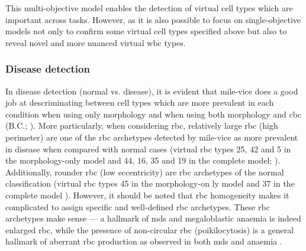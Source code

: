 \begin{figure}[!ht]
    \label{fig:rbc-mo-examples}
\end{figure}

This multi-objective model enables the detection of virtual cell types which are important across tasks. However, as it is also possible to focus on single-objective models not only to confirm some virtual cell types specified above but also to reveal novel and more nuanced virtual \ac{wbc} types.

\subsubsection{Disease detection} 

In disease detection (normal vs. disease), it is evident that \ac{mile-vice} does a good job at descriminating between cell types which are more prevalent in each condition when using only morphology and when using both morphology and \ac{cbc} (B.C.; ). More particularly, when considering \ac{rbc}, relatively large \ac{rbc} (high perimeter) are one of the \ac{rbc} archetypes detected by \ac{mile-vice} as more prevalent in disease when compared with normal cases (virtual \ac{rbc} types 25, 42 and 5 in the morphology-only model and 44, 16, 35 and 19 in the complete model; ). Additionally, rounder \ac{rbc} (low eccentricity) are \ac{rbc} archetypes of the normal classification (virtual \ac{rbc} types 45 in the morphology-on ly model and 37 in the complete model ). However, it should be noted that \ac{rbc} homogeneity makes it complicated to assign specific and well-defined \ac{rbc} archetypes. These \ac{rbc} archetypes make sense --- a hallmark of \ac{mds} and megaloblastic anaemia is indeed enlarged \ac{rbc}, while the presence of non-circular \ac{rbc} (poikilocytosis) is a general hallmark of aberrant \ac{rbc} production as observed in both \ac{mds} and anaemia \cite{Ford2013-nd}. 

\begin{figure}[!ht]
    \label{fig:mile-vice-vcq-so-disease-detection}
\end{figure}

